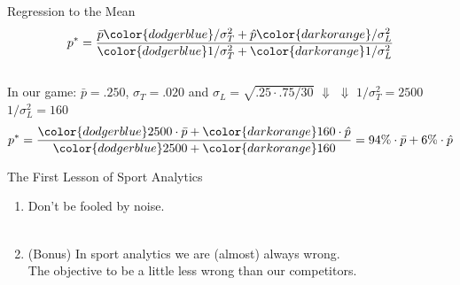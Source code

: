 \documentclass[handout]{beamer}
\begin{document}
  \begin{frame}{Regression to the Mean}
    $$p^* = \frac{\bar p {\color{dodgerblue}/ \sigma^2_T} + \hat p {\color{darkorange}/ \sigma^2_L}}{{\color{dodgerblue}1 / \sigma^2_T} + {\color{darkorange}1 / \sigma^2_L}}$$
    \vspace{1cm}\\
    \pause
    In our game: $\bar p = .250$, $\sigma_T = .020$ and $\sigma_L = \sqrt{.25 \cdot .75 / 30}$
    \tabto{45mm} $\Downarrow$ \tabto{69mm} $\Downarrow$
    \tabto{35mm} {\color{dodgerblue}$1 / \sigma_T^2 = 2500$} \tabto{60mm} {\color{darkorange}$1 / \sigma_L^2 = 160$}
    $$p^* = \frac{{\color{dodgerblue}2500} \cdot \bar p + {\color{darkorange} 160} \cdot \hat p}{{\color{dodgerblue}2500} + {\color{darkorange} 160}} = 94\% \cdot \bar p + 6\% \cdot \hat p$$
  \end{frame}

  \begin{frame}{The First Lesson of Sport Analytics}
    \begin{enumerate}
      \item Don't be fooled by noise.\\
      ~\\
      \pause
      \item (Bonus) In sport analytics we are (almost) always wrong.\\The objective to be a little less wrong than our competitors.
    \end{enumerate}
  \end{frame}
\end{document}
